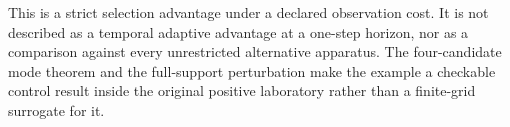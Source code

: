 This is a strict selection advantage under a declared observation cost. It is not described as a temporal adaptive advantage at a one-step horizon, nor as a comparison against every unrestricted alternative apparatus. The four-candidate mode theorem and the full-support perturbation make the example a checkable control result inside the original positive laboratory rather than a finite-grid surrogate for it.
